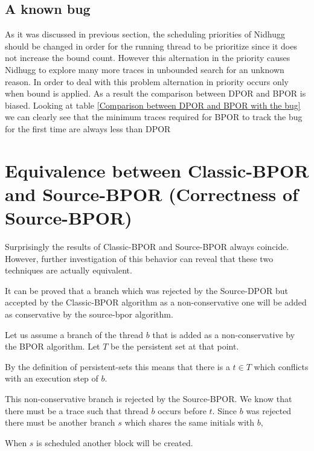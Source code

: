 \subsection{A known bug}
As it was discussed in previous section, the scheduling priorities of Nidhugg should be changed in order for the running
thread to be prioritize since it does not increase the bound count. However this alternation in the priority causes
Nidhugg to explore many more traces in unbounded search for an unknown reason. In order to deal with this problem
alternation in priority occurs only when bound is applied. As a result the comparison between DPOR and BPOR is biased.
Looking at table \ref{Comparison between DPOR and BPOR with the bug} we can clearly see that the minimum traces required
for BPOR to track the bug for the first time are always less than DPOR


\section{Equivalence between Classic-BPOR and Source-BPOR (Correctness of Source-BPOR)}
Surprisingly the results of Classic-BPOR and Source-BPOR always coincide. However, further investigation of this
behavior can reveal that these two techniques are actually equivalent. 

It can be proved that a branch which was rejected by the Source-DPOR but accepted by the Classic-BPOR algorithm as a
non-conservative one will be added as conservative by the source-bpor algorithm.

Let us assume a branch of the thread $b$ that is added as a non-conservative by the BPOR algorithm. Let $T$ be the
persistent set at that point.

By the definition of persistent-sets this means that there is a $t \in T$ which
conflicts with an execution step of $b$. 

This non-conservative branch is rejected by the Source-BPOR. We know that there must be a trace such that thread $b$
 occurs before $t$. Since $b$ was rejected there must be another branch $s$ which shares the same initials with $b$, 
  
When $s$ is scheduled another block will be created.
 
